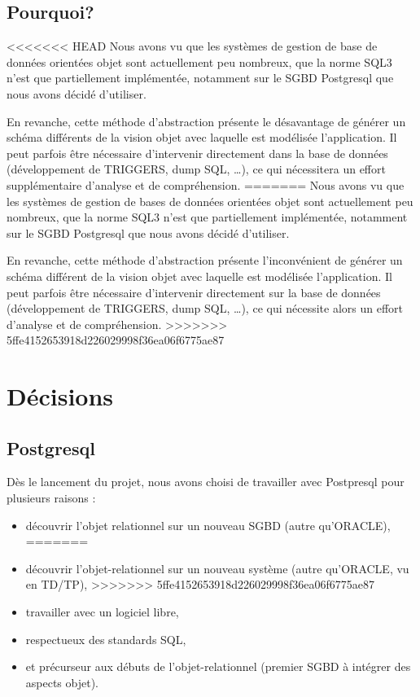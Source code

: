 	\subsection{Pourquoi?}
<<<<<<< HEAD
    Nous avons vu que les systèmes de gestion de base de données orientées objet sont actuellement peu nombreux, que la norme SQL3 n'est que partiellement implémentée, notamment sur le SGBD Postgresql que nous avons décidé d'utiliser.
    
En revanche, cette méthode d'abstraction présente le désavantage de générer un schéma différents de la vision objet avec laquelle est modélisée l'application. Il peut parfois être nécessaire d'intervenir directement dans la base de données (développement de TRIGGERS, dump SQL, \ldots), ce qui nécessitera un effort supplémentaire d'analyse et de compréhension.
=======
    Nous avons vu que les systèmes de gestion de bases de données orientées objet sont actuellement peu nombreux, que la norme SQL3 n'est que partiellement implémentée, notamment sur le SGBD Postgresql que nous avons décidé d'utiliser.
    
En revanche, cette méthode d'abstraction présente l'inconvénient de générer un schéma différent de la vision objet avec laquelle est modélisée l'application. Il peut parfois être nécessaire d'intervenir directement sur la base de données (développement de TRIGGERS, dump SQL, \ldots), ce qui nécessite alors un effort d'analyse et de compréhension.
>>>>>>> 5ffe4152653918d226029998f36ea06f6775ae87

\section{Décisions}

\subsection{Postgresql}

Dès le lancement du projet, nous avons choisi de travailler avec Postpresql pour plusieurs raisons :
\begin{itemize}
<<<<<<< HEAD
\item découvrir l'objet relationnel sur un nouveau SGBD (autre qu'ORACLE),
=======
\item découvrir l'objet-relationnel sur un nouveau système (autre qu'ORACLE, vu en TD/TP),
>>>>>>> 5ffe4152653918d226029998f36ea06f6775ae87
\item travailler avec un logiciel libre,
\item respectueux des standards SQL,
\item et précurseur aux débuts de l'objet-relationnel (premier SGBD à intégrer des aspects objet).
\end{itemize}

